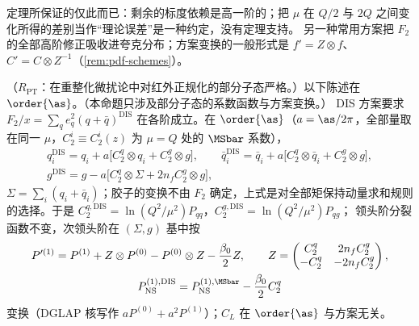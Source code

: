 \noindent
定理所保证的仅此而已：剩余的标度依赖是高一阶的；把 $\mu$ 在 $Q/2$ 与 $2Q$ 之间变化所得的差别当作“理论误差”是一种约定，没有定理支持。
另一种常用方案把 $F_2$ 的全部高阶修正吸收进夸克分布；方案变换的一般形式是 $f'=Z\otimes f$、$C'=C\otimes Z^{-1}$（\cref{rem:pdf-schemes}）。

\begin{proposition}\label{prop:disall-dis-scheme}
（$R_{\mathrm{PT}}$：在重整化微扰论中对红外正规化的部分子态严格。）以下陈述在 $\order{\as}$。（本命题只涉及部分子态的系数函数与方案变换。）
DIS 方案要求 $F_2/x=\sum_qe_q^2(q+\bar q)^{\mathrm{DIS}}$ 在各阶成立。在 $\order{\as}$（$a=\as/2\pi$，全部量取在同一 $\mu$，$C_2^i\equiv C_2^i(z)$ 为 $\mu=Q$ 处的 $\MSbar$ 系数），
\begin{equation}\label{eq:disall-dis-scheme}
\begin{gathered}
q_i^{\mathrm{DIS}}=q_i+a\big[C_2^q\otimes q_i+C_2^g\otimes g\big],\qquad \bar q_i^{\mathrm{DIS}}=\bar q_i+a\big[C_2^q\otimes\bar q_i+C_2^g\otimes g\big],\\
g^{\mathrm{DIS}}=g-a\big[C_2^q\otimes\Sigma+2n_fC_2^g\otimes g\big],   %
\end{gathered}
\end{equation}
$\Sigma=\sum_i(q_i+\bar q_i)$；胶子的变换不由 $F_2$ 确定，上式是对全部矩保持动量求和规则的选择。于是 $C_2^{q,\mathrm{DIS}}=\ln(Q^2/\mu^2)P_{qq}$，$C_2^{g,\mathrm{DIS}}=\ln(Q^2/\mu^2)P_{qg}$；
领头阶分裂函数不变，次领头阶在 $(\Sigma,g)$ 基中按
\begin{equation}\label{eq:disall-P1}
\begin{gathered}
P'^{(1)}=P^{(1)}+Z\otimes P^{(0)}-P^{(0)}\otimes Z-\frac{\beta_0}2Z,\qquad Z=\begin{pmatrix}C_2^q&2n_fC_2^g\\-C_2^q&-2n_fC_2^g\end{pmatrix},\\
P^{(1),\mathrm{DIS}}_{\mathrm{NS}}=P^{(1),\MSbar}_{\mathrm{NS}}-\frac{\beta_0}2C_2^q   %
\end{gathered}
\end{equation}
变换（DGLAP 核写作 $aP^{(0)}+a^2P^{(1)}$）；$C_L$ 在 $\order{\as}$ 与方案无关。
\end{proposition}

